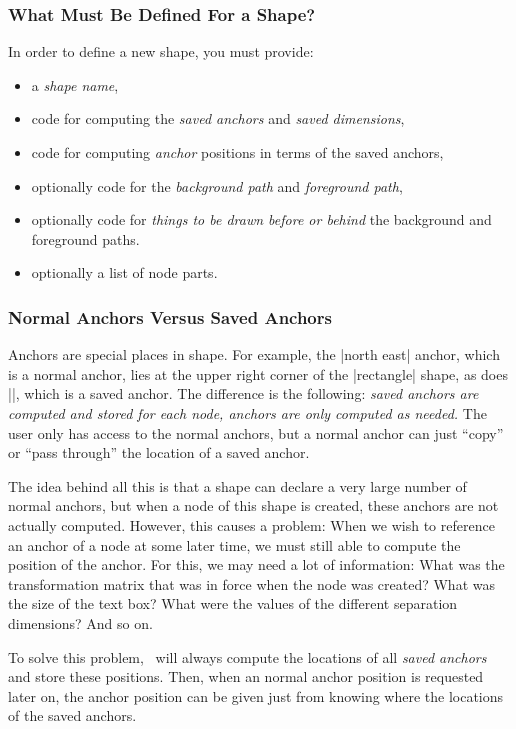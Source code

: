 \subsubsection{What Must Be Defined For a Shape?}

In order to define a new shape, you must provide:
\begin{itemize}
\item
  a \emph{shape name},
\item
  code for computing the  \emph{saved anchors} and \emph{saved
    dimensions}, 
\item
  code for computing \emph{anchor} positions in terms of the saved anchors,
\item
  optionally code for the \emph{background path} and \emph{foreground path},
\item
  optionally code for \emph{things to be drawn before or behind} the
  background and foreground paths.
\item
  optionally a list of node parts.
\end{itemize}


\subsubsection{Normal Anchors Versus Saved Anchors}

Anchors  are special places in shape. For example, the |north east|
anchor, which is a normal anchor, lies at the upper right corner of
the  |rectangle| shape, as does |\northeast|, which is a saved
anchor. The difference is the following: \emph{saved anchors are 
  computed and stored for each node, anchors are only computed as
  needed.} The user only has access to the normal anchors, but a
normal anchor can just ``copy'' or ``pass through'' the location of a
saved anchor. 

The idea behind all this is that a shape can declare a very large
number of normal anchors, but when a node of this shape is created,
these anchors are not actually computed. However, this causes a
problem: When we wish to reference an anchor of a node at some later
time, we must still able to compute the position of the anchor. For 
this, we may need a lot of information: What was the transformation
matrix that was in force when the node was created? What was the size
of the text box? What were the values of the different separation
dimensions? And so on. 

To solve this problem, \pgfname\ will always compute the locations of
all \emph{saved anchors} and store these positions. Then, when an
normal anchor position is requested later on, the anchor position can
be given just from knowing where the locations of the saved anchors.

